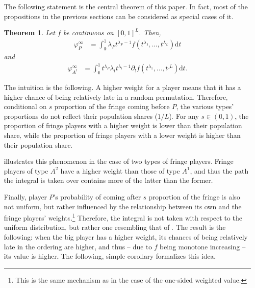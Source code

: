 \documentclass[a4paper]{article}
\newtheorem{theorem}{Theorem}
\newcommand{\dt}{\mathrm{d}t}
\begin{document}
The following statement is the central theorem of this paper.
In fact, most of the propositions in the previous sections can be considered as special cases of it.
\begin{theorem}
    \label{prop:many_sided_weighted}
    Let $f$ be continuous on $[0, 1]^L$.
    Then,
    \begin{align*}
        \varphi_P^\infty & = \int_0^1 \lambda_P t^{\lambda_P - 1} f(t^{\lambda_1}, \dots, t^{\lambda_L}) \dt
    \end{align*}
    and
    \begin{align*}
        \varphi_{A^l}^\infty & = \int_0^1 t^{\lambda_P} \lambda_l t^{\lambda_l - 1} \partial_l f(t^{\lambda_1}, \dots, t^{\_L}) \dt.
    \end{align*}
\end{theorem}
The intuition is the following.
A higher weight for a player means that it has a higher chance of being relatively late in a random permutation.
Therefore, conditional on $s$ proportion of the fringe coming before $P$, the various types' proportions do not reflect their population shares ($1/L$).
For any $s \in (0, 1)$, the proportion of fringe players with a higher weight is lower than their population share, while the proportion of fringe players with a lower weight is higher than their population share.

 illustrates this phenomenon in the case of two types of fringe players.
Fringe players of type $A^2$ have a higher weight than those of type $A^1$, and thus the path the integral is taken over contains more of the latter than the former.

Finally, player $P$'s probability of coming after $s$ proportion of the fringe is also not uniform, but rather influenced by the relationship between its own and the fringe players' weights.\footnote{
    This is the same mechanism as in the case of the one-sided weighted value.
} 
Therefore, the integral is not taken with respect to the uniform distribution, but rather one resembling that of .
The result is the following: when the big player has a higher weight, its chances of being relatively late in the ordering are higher, and thus -- due to $f$ being monotone increasing -- its value is higher.
The following, simple corollary formalizes this idea.
\end{document}

